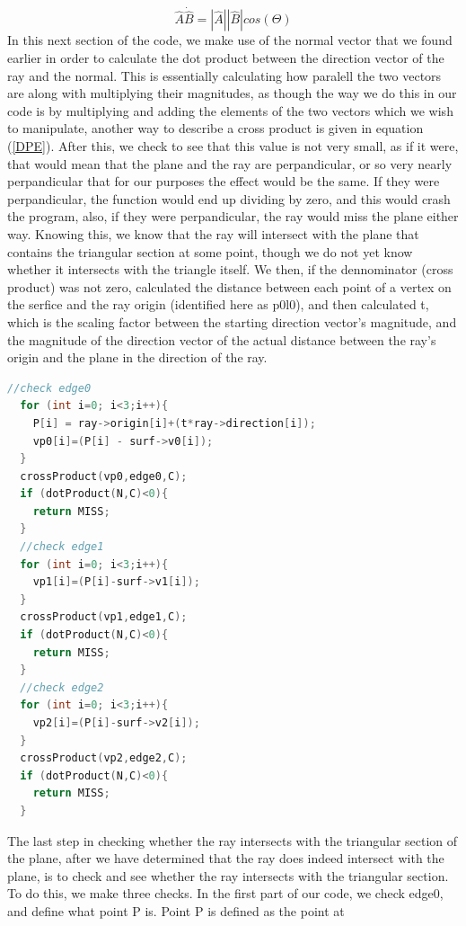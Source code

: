\documentclass{article}
\begin{document}
\begin{equation}
  \hat{A}\dot\hat{B}=|\hat{A}||\hat{B}|cos(\Theta)
  \label{DPE}
\end{equation}
In this next section of the code, we make use of the normal vector that we found earlier in order to calculate the
dot product between the direction vector of the ray and the normal. This is essentially calculating how paralell the
two vectors are along with multiplying their magnitudes, as though the way we do this in our code is by multiplying and
adding the elements of the two vectors which we wish to manipulate, another way to describe a cross product is given in
equation (\ref{DPE}). After this, we check to see that this value is not very small, as if it were, that would mean that
the plane and the ray are perpandicular, or so very nearly perpandicular that for our purposes the effect would be the same.
If they were perpandicular, the function would end up dividing by zero, and this would crash the program, also, if they were
perpandicular, the ray would miss the plane either way. Knowing this, we know that the ray will intersect with the plane that
contains the triangular section at some point, though we do not yet know whether it intersects with the triangle itself. We then,
if the dennominator (cross product) was not zero, calculated the distance between each point of a vertex on the serfice and the
ray origin (identified here as p0l0), and then calculated t, which is the scaling factor between the starting direction vector's
magnitude, and the magnitude of the direction vector of the actual distance between the ray's origin and the plane in the direction
of the ray.
\begin{lstlisting}[language = C]
  //check edge0
  for (int i=0; i<3;i++){
    P[i] = ray->origin[i]+(t*ray->direction[i]);
    vp0[i]=(P[i] - surf->v0[i]);
  }
  crossProduct(vp0,edge0,C);
  if (dotProduct(N,C)<0){
    return MISS;
  }
  //check edge1
  for (int i=0; i<3;i++){
    vp1[i]=(P[i]-surf->v1[i]);
  }
  crossProduct(vp1,edge1,C);
  if (dotProduct(N,C)<0){
    return MISS;
  }
  //check edge2
  for (int i=0; i<3;i++){
    vp2[i]=(P[i]-surf->v2[i]);
  }
  crossProduct(vp2,edge2,C);
  if (dotProduct(N,C)<0){
    return MISS;
  }
\end{lstlisting}
The last step in checking whether the ray intersects with the triangular section of the plane, after we have determined that the
ray does indeed intersect with the plane, is to check and see whether the ray intersects with the triangular section. To do this,
we make three checks. In the first part of our code, we check edge0, and define what point P is. Point P is defined as the point at
\end{document}
